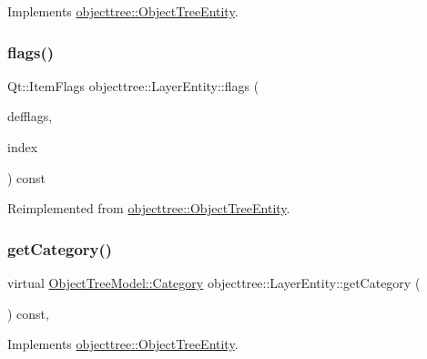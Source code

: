Implements \mbox{\hyperlink{classobjecttree_1_1_object_tree_entity_a2413c6573de18b451d97eb3800f10f35}{objecttree\+::\+Object\+Tree\+Entity}}.

\mbox{\label{classobjecttree_1_1_layer_entity_afe44a5207b2838788a2ccb34ffe5f527}} 
\subsubsection{\texorpdfstring{flags()}{flags()}}
{\footnotesize\ttfamily Qt\+::\+Item\+Flags objecttree\+::\+Layer\+Entity\+::flags (\begin{DoxyParamCaption}\item[{Qt\+::\+Item\+Flags}]{defflags,  }\item[{const Q\+Model\+Index \&}]{index }\end{DoxyParamCaption}) const\hspace{0.3cm}{\ttfamily [virtual]}}



Reimplemented from \mbox{\hyperlink{classobjecttree_1_1_object_tree_entity_a71042bfb5a8328bcbde9d283c0b1b28c}{objecttree\+::\+Object\+Tree\+Entity}}.

\mbox{\label{classobjecttree_1_1_layer_entity_a5f5e84032c7704a976dab26fb28b6f53}} 
\subsubsection{\texorpdfstring{getCategory()}{getCategory()}}
{\footnotesize\ttfamily virtual \mbox{\hyperlink{class_object_tree_model_a379e9d6b0d381853785adf62095ba4e3}{Object\+Tree\+Model\+::\+Category}} objecttree\+::\+Layer\+Entity\+::get\+Category (\begin{DoxyParamCaption}{ }\end{DoxyParamCaption}) const\hspace{0.3cm}{\ttfamily [inline]}, {\ttfamily [virtual]}}



Implements \mbox{\hyperlink{classobjecttree_1_1_object_tree_entity_aa4e80e7fa80672c1b9902add665abc77}{objecttree\+::\+Object\+Tree\+Entity}}.

